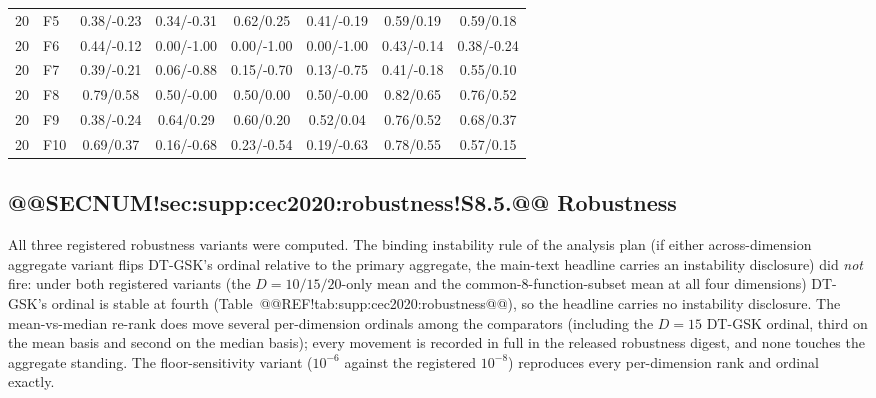 \documentclass[10pt,a4paper]{article}
\newcommand{\dtgsk}{DT-GSK}
\begin{document}
\begin{table}[p]
\begin{tabular}{clcccccc}
20 & F5 & 0.38/-0.23 & 0.34/-0.31 & 0.62/0.25 & 0.41/-0.19 & 0.59/0.19 & 0.59/0.18 \\
20 & F6 & 0.44/-0.12 & 0.00/-1.00 & 0.00/-1.00 & 0.00/-1.00 & 0.43/-0.14 & 0.38/-0.24 \\
20 & F7 & 0.39/-0.21 & 0.06/-0.88 & 0.15/-0.70 & 0.13/-0.75 & 0.41/-0.18 & 0.55/0.10 \\
20 & F8 & 0.79/0.58 & 0.50/-0.00 & 0.50/0.00 & 0.50/-0.00 & 0.82/0.65 & 0.76/0.52 \\
20 & F9 & 0.38/-0.24 & 0.64/0.29 & 0.60/0.20 & 0.52/0.04 & 0.76/0.52 & 0.68/0.37 \\
20 & F10 & 0.69/0.37 & 0.16/-0.68 & 0.23/-0.54 & 0.19/-0.63 & 0.78/0.55 & 0.57/0.15 \\
\bottomrule
\end{tabular}
\end{table}




\clearpage
\subsection{@@SECNUM!sec:supp:cec2020:robustness!S8.5.@@ Robustness}\label{sec:supp:cec2020:robustness}

All three registered robustness variants were computed.  The binding
instability rule of the analysis plan (if either across-dimension
aggregate variant flips \dtgsk{}'s ordinal relative to the primary
aggregate, the main-text headline carries an instability disclosure)
did \emph{not} fire: under both registered variants (the $D = 10/15/20$-only
mean and the common-8-function-subset mean at all four dimensions)
\dtgsk{}'s ordinal is stable at fourth
(Table~@@REF!tab:supp:cec2020:robustness@@), so the headline carries no
instability disclosure.  The mean-vs-median re-rank does move several
per-dimension ordinals among the comparators (including the $D = 15$
\dtgsk{} ordinal, third on the mean basis and second on the median
basis); every movement is recorded in full in the released robustness
digest, and none touches the aggregate standing.  The floor-sensitivity
variant ($10^{-6}$ against the registered $10^{-8}$) reproduces every
per-dimension rank and ordinal exactly.
\end{document}
